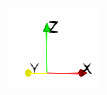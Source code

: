 \begin{figure}[!htb]
  \centering
  \begin{subfigure}[b]{0.1\textwidth}
    \centering
    \includegraphics[width=\textwidth]{Chapter5/figures/spallation/orientation_axis}
    \vspace{2em}
  \end{subfigure}
  \begin{subfigure}[b]{0.16\textwidth}
    \centering

\end{subfigure}
\end{figure}
